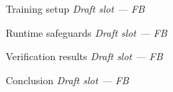 \begin{frame}{Training setup}
  \centering\textit{Draft slot --- FB}
\end{frame}
\begin{frame}{Runtime safeguards}
  \centering\textit{Draft slot --- FB}
\end{frame}
\begin{frame}{Verification results}
  \centering\textit{Draft slot --- FB}
\end{frame}
\begin{frame}{Conclusion}
  \centering\textit{Draft slot --- FB}
\end{frame}
